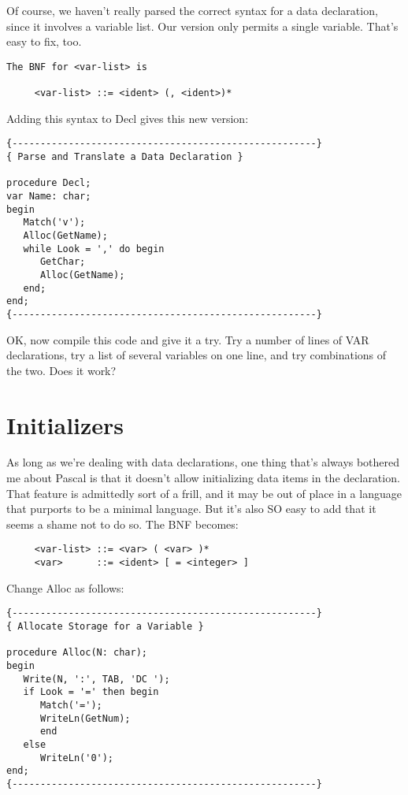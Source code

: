 Of course, we haven't really parsed the correct syntax for a data declaration, since it involves a variable list. Our version only permits a single variable. That's easy to fix, too.

\begin{verbatim}
The BNF for <var-list> is

     <var-list> ::= <ident> (, <ident>)*
\end{verbatim}

Adding this syntax to Decl gives this new version:

\begin{verbatim}
{------------------------------------------------------}
{ Parse and Translate a Data Declaration }

procedure Decl;
var Name: char;
begin
   Match('v');
   Alloc(GetName);
   while Look = ',' do begin
      GetChar;
      Alloc(GetName);
   end;
end;
{------------------------------------------------------}
\end{verbatim}

OK, now compile this code and give it  a  try. Try a number of lines of VAR declarations, try a list of several variables on one line, and try combinations of the two. Does it work?

\section{Initializers}

As long as we're dealing with data declarations, one thing that's always  bothered  me  about  Pascal  is  that  it  doesn't  allow initializing  data items in the declaration. That  feature  is admittedly sort of a frill, and it  may  be  out  of  place  in a language that purports to  be  a minimal language. But it's also SO easy to add that it seems a shame not  to  do  so. The  BNF becomes:

\begin{verbatim}
     <var-list> ::= <var> ( <var> )*
     <var>      ::= <ident> [ = <integer> ]
\end{verbatim}

Change Alloc as follows:

\begin{verbatim}
{------------------------------------------------------}
{ Allocate Storage for a Variable }

procedure Alloc(N: char);
begin
   Write(N, ':', TAB, 'DC ');
   if Look = '=' then begin
      Match('=');
      WriteLn(GetNum);
      end
   else
      WriteLn('0');
end;
{------------------------------------------------------}
\end{verbatim}

